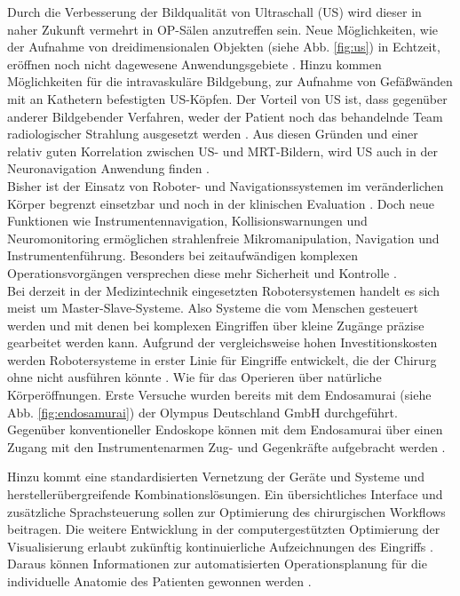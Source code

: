 Durch die Verbesserung der Bildqualität von Ultraschall (US) wird dieser in naher Zukunft vermehrt in OP-Sälen anzutreffen sein. Neue Möglichkeiten, wie der Aufnahme von dreidimensionalen Objekten (siehe Abb. \ref{fig:us}) in Echtzeit, eröffnen noch nicht dagewesene Anwendungsgebiete \cite{BrainShiftInTumorResection}. Hinzu kommen Möglichkeiten für die intravaskuläre Bildgebung, zur Aufnahme von Gefäßwänden mit an Kathetern befestigten US-Köpfen. Der Vorteil von US ist, dass gegenüber anderer Bildgebender Verfahren, weder der Patient noch das behandelnde Team radiologischer Strahlung ausgesetzt werden \cite{CurrentAndFuture}. Aus diesen Gründen und einer relativ guten Korrelation zwischen US- und MRT-Bildern, wird US auch in der Neuronavigation Anwendung finden \cite{BrainShiftInTumorResection}. \\
Bisher ist der Einsatz von Roboter- und Navigationssystemen im veränderlichen Körper begrenzt einsetzbar und noch in der klinischen Evaluation \cite{DerDigitaleOperationssaal}. Doch neue Funktionen wie Instrumentennavigation, Kollisionswarnungen und Neuromonitoring ermöglichen strahlenfreie Mikromanipulation, Navigation und Instrumentenführung. Besonders bei zeitaufwändigen komplexen Operationsvorgängen versprechen diese mehr Sicherheit und Kontrolle \cite{DerDigitaleOperationssaal,CurrentAndFuture}. \\
Bei derzeit in der Medizintechnik eingesetzten Robotersystemen handelt es sich meist um Master-Slave-Systeme. Also Systeme die vom Menschen gesteuert werden und mit denen bei komplexen Eingriffen über kleine Zugänge präzise gearbeitet werden kann. Aufgrund der vergleichsweise hohen Investitionskosten werden Robotersysteme in erster Linie für Eingriffe entwickelt, die der Chirurg ohne nicht ausführen könnte \cite{DerDigitaleOperationssaal}. Wie für das Operieren über natürliche Körperöffnungen. Erste Versuche wurden bereits mit dem Endosamurai (siehe Abb. \ref{fig:endosamurai}) der Olympus Deutschland GmbH durchgeführt. Gegenüber konventioneller Endoskope können mit dem Endosamurai über einen Zugang mit den Instrumentenarmen Zug- und Gegenkräfte aufgebracht werden \cite{Endosamurai,DerDigitaleOperationssaal}. 

Hinzu kommt eine standardisierten Vernetzung der Geräte und Systeme und herstellerübergreifende Kombinationslösungen. Ein übersichtliches Interface und zusätzliche Sprachsteuerung sollen zur Optimierung des chirurgischen Workflows beitragen. Die weitere Entwicklung in der computergestützten Optimierung der Visualisierung erlaubt zukünftig kontinuierliche Aufzeichnungen des Eingriffs \cite{DerDigitaleOperationssaal}. Daraus können Informationen zur automatisierten Operationsplanung für die individuelle Anatomie des Patienten gewonnen werden \cite{CurrentAndFuture}.


